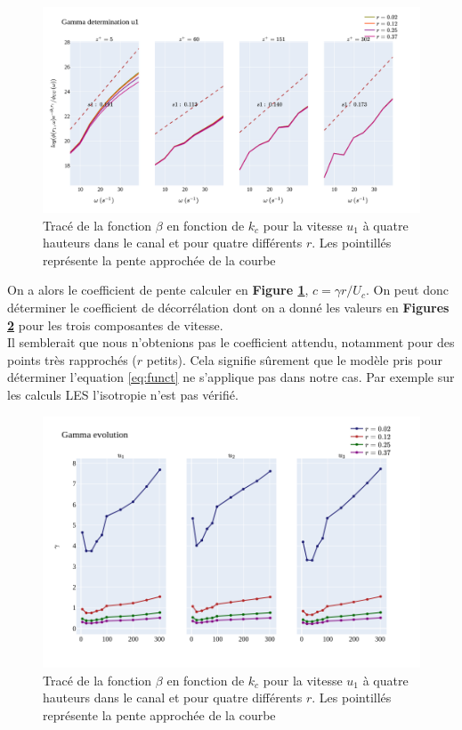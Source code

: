 \documentclass[12pt]{article}
\theoremstyle{plain}
\theoremstyle{remark}
\begin{document}
\begin{figure}[h!]
	\begin{center}
		\includegraphics[width=0.9\linewidth]{../../output/figures/channel_wrles_retau395/split_time/gamma/gamma_u1_w.png}
		\caption{Tracé de la fonction $\beta$ en fonction de $k_c$ pour la vitesse $u_1$ à quatre hauteurs dans le canal et pour quatre différents $r$. Les pointillés représente la pente approchée de la courbe}
		\label{fig:gamma_w}
	\end{center}
\end{figure}

On a alors le coefficient de pente calculer en {\bf Figure \ref{fig:gamma_w}}, $c=\gamma r / U_c$. On peut donc déterminer le coefficient de décorrélation dont on a donné les valeurs en {\bf Figures \ref{fig:gamma_w_view}} pour les trois composantes de vitesse. \\

Il semblerait que nous n'obtenions pas le coefficient attendu, notamment pour des points très rapprochés ($r$ petits). Cela signifie sûrement que le modèle pris pour déterminer l'equation \ref{eq:funct} ne s'applique pas dans notre cas. Par exemple sur les calculs LES l'isotropie n'est pas vérifié.

\begin{figure}[h!]
	\begin{center}
		\includegraphics[width=0.8\linewidth]{../../output/figures/channel_wrles_retau395/split_time/gamma/gamma_view_w_all.png}
		\caption{Tracé de la fonction $\beta$ en fonction de $k_c$ pour la vitesse $u_1$ à quatre hauteurs dans le canal et pour quatre différents $r$. Les pointillés représente la pente approchée de la courbe}
		\label{fig:gamma_w_view}
	\end{center}
\end{figure}
\end{document}
